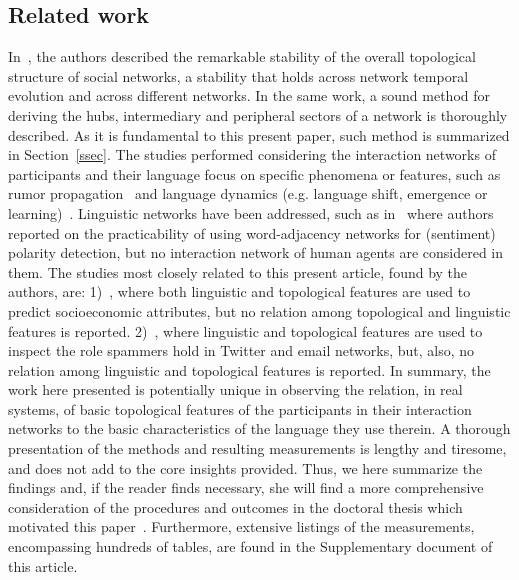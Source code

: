 \documentclass[review]{elsarticle}
\begin{document}
\subsection{Related work}
In~\cite{stab}, the authors described the remarkable stability of the
overall topological structure of social networks,
a stability that holds across network temporal evolution and across different networks.
In the same work, a sound method for deriving the hubs, intermediary and peripheral sectors of a network is thoroughly described.
As it is fundamental to this present paper, such method is summarized in Section~\ref{ssec}.
The studies performed considering the interaction networks of participants and their language focus on specific phenomena or features,
such as rumor propagation~\cite{r1,r2,r3,r4} and language dynamics (e.g. language shift, emergence or learning)~\cite{s1,s2,s3,s4,s5,s6,s7,s8,s9}.
Linguistic networks have been addressed, such as in~\cite{diego} where authors reported on the
practicability of using word-adjacency networks for (sentiment) polarity detection, but no interaction network of human agents are considered in them.
The studies most closely related to this present article, found by the authors, are:
1)~\cite{ex1}, where both linguistic and topological features are used to predict socioeconomic attributes,
but no relation among topological and linguistic features is reported.
2)~\cite{ex2}, where linguistic and topological features are used to inspect the role spammers hold
in Twitter and email networks, but, also, no relation among linguistic and topological features is reported.
In summary, the work here presented is potentially unique in observing
the relation, in real systems, of basic topological features of the participants
in their interaction networks to the basic characteristics of the language they use therein.
A thorough presentation of the methods and resulting measurements 
is lengthy and tiresome, and does not add to the core insights provided.
Thus, we here summarize the findings and, if the reader finds necessary,
she will find a more comprehensive consideration of the procedures
and outcomes in the doctoral thesis which motivated this paper~\cite{thesis}.
Furthermore, extensive listings of the measurements, encompassing hundreds of tables, are found in the Supplementary document of this article.
\end{document}
